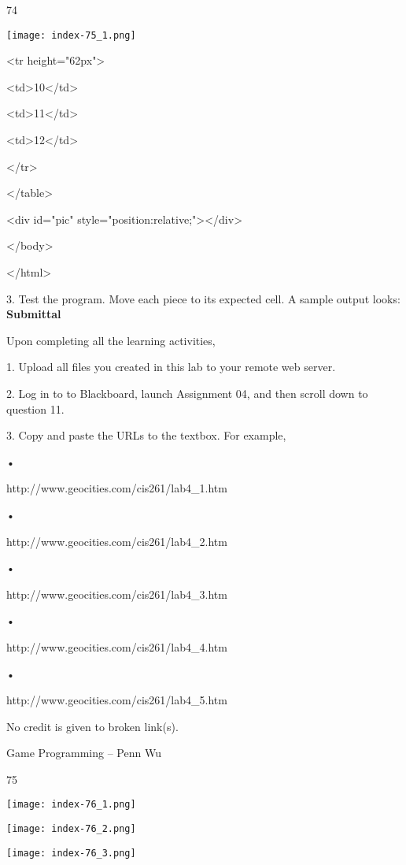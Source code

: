 \documentclass[
]{article}
\begin{document}
74

\protect\hypertarget{index_split_005.htmlux5cux23p75}{}{}\texttt{[image: index-75\_1.png]}

\textless tr height="62px"\textgreater{}

\textless td\textgreater10\textless/td\textgreater{}

\textless td\textgreater11\textless/td\textgreater{}

\textless td\textgreater12\textless/td\textgreater{}

\textless/tr\textgreater{}

\textless/table\textgreater{}

\textless div id="pic"
style="position:relative;"\textgreater\textless/div\textgreater{}

\textless/body\textgreater{}

\textless/html\textgreater{}

3. Test the program. Move each piece to its expected cell. A sample
output looks: \textbf{Submittal}

Upon completing all the learning activities,

1. Upload all files you created in this lab to your remote web server.

2. Log in to to Blackboard, launch Assignment 04, and then scroll down
to question 11.

3. Copy and paste the URLs to the textbox. For example,

•

http://www.geocities.com/cis261/lab4\_1.htm

•

http://www.geocities.com/cis261/lab4\_2.htm

•

http://www.geocities.com/cis261/lab4\_3.htm

•

http://www.geocities.com/cis261/lab4\_4.htm

•

http://www.geocities.com/cis261/lab4\_5.htm

No credit is given to broken link(s).

Game Programming -- Penn Wu

75

\protect\hypertarget{index_split_005.htmlux5cux23p76}{}{}\texttt{[image: index-76\_1.png]}

\texttt{[image: index-76\_2.png]}

\texttt{[image: index-76\_3.png]}
\end{document}
